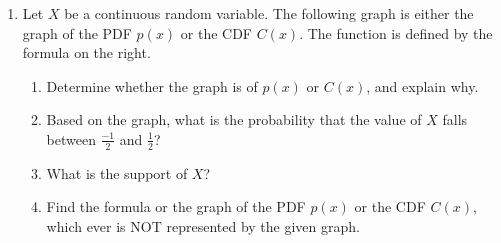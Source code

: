 \documentclass[11pt]{article}
\begin{document}
\begin{enumerate}
\begin{enumerate}
\item
\begin{itemize}
\item Compute $E[X]$.
\vfill
\item Compute $E[X^2]$.
\vfill
\item Compute $Var(X)$.
\vfill
\end{itemize}
\end{enumerate}
\newpage

\item[\textbf{P2.}]
Let $X$ be a continuous random variable. The following graph is either the graph of the PDF $p(x)$ or the CDF $C(x)$.
The function is defined by the formula on the right.

\begin{center}
     \end{center}

\begin{enumerate}
    \item[(a)] Determine whether the graph is of $p(x)$ or $C(x)$, and explain why. 

    \vfill

    \item[(b)] Based on the graph, what is the probability that the value of $X$ falls between $\frac{-1}{2}$ and $\frac{1}{2}$?

    \vfill

    \item[(c)] What is the support of $X$?

    \vfill

    \item[(d)] Find the formula or the graph of the PDF $p(x)$ or the CDF $C(x)$, which ever is NOT represented by the given graph.

    \vfill
\end{enumerate}
\newpage

\end{enumerate}
\end{document}
